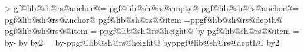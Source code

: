 {{{{            \pgfmathloop%
                \ifnum\pgfmathcounter>\parts%
                \else%
                    \pgf@lib@sh@getalpha\pgf@lib@sh@rs@number{\pgfmathcounter}%
                    \expandafter\let\csname pgf@lib@sh@rs@anchor@\pgf@lib@sh@rs@number\endcsname=\pgfutil@empty%
                    \expandafter\ifx\csname pgf@lib@sh@rs@empty@\pgf@lib@sh@rs@number\endcsname\pgfutil@empty%
                        \ifpgfrectanglesplitignoreemptyparts%
                            \expandafter\let\csname pgf@lib@sh@rs@anchor@\pgf@lib@sh@rs@number\endcsname=%
                                \pgf@lib@sh@rs@lastanchor%
                        \fi%
                    \fi%
                    \expandafter\ifx\csname pgf@lib@sh@rs@anchor@\pgf@lib@sh@rs@number\endcsname\pgfutil@empty%
                        \expandafter\ifx\csname pgf@lib@sh@rs@\pgf@lib@sh@rs@number @item\endcsname%
                                \pgf@lib@sh@rs@bottomtext%
                            \pgf@y=\csname pgf@lib@sh@rs@depth@\pgf@lib@sh@rs@number\endcsname\relax%
                        \else%
                            \expandafter\ifx\csname pgf@lib@sh@rs@\pgf@lib@sh@rs@number @item\endcsname%
                                    \pgf@lib@sh@rs@toptext%
                                \pgf@y=-\csname pgf@lib@sh@rs@height@\pgf@lib@sh@rs@number\endcsname\relax%
                                \advance\pgf@y by\pgf@lib@sh@rs@max@totalheight\relax%
                            \else%
                                \expandafter\ifx\csname pgf@lib@sh@rs@\pgf@lib@sh@rs@number @item\endcsname%
                                        \pgf@lib@sh@rs@basetext%
                                    \pgf@y=\pgf@lib@sh@rs@max@totalheight\relax%
                                    \advance\pgf@y by-\pgfutil@tempdima%
                                    \advance\pgf@y by\pgfutil@tempdimb%
                                    \divide\pgf@y by2\relax%
                                \else%
                                    \pgf@y=\pgf@lib@sh@rs@max@totalheight\relax%
                                    \advance\pgf@y by-\csname pgf@lib@sh@rs@height@\pgf@lib@sh@rs@number\endcsname\relax%
                                    \advance\pgf@y by\csname pgf@lib@sh@rs@depth@\pgf@lib@sh@rs@number\endcsname\relax%
                                    \divide\pgf@y by2\relax%
                                \fi%
                            \fi%
                        \fi%
}}}}
